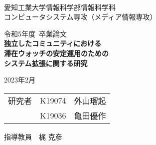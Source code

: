 \begin{titlepage}

  \ \\
  \begin{center}

    {\LARGE 愛知工業大学情報科学部情報科学科\\
      コンピュータシステム専攻（メディア情報専攻）

      \vspace{1.0cm}

      令和5年度~卒業論文\\

      \vspace{2.0cm}
      {\Huge
        \baselineskip=15mm
        \textbf{独立したコミュニティにおける\\滞在ウォッチの安定運用のための\\システム拡張に関する研究\\}}

      \vspace{7.0cm}

      2023年2月\\

      \vspace{1.0cm}

      \begin{tabular}[h]{lll}
        研究者 & K19074 & 外山瑠起 \\
            & K19036 & 亀田優作 \\
      \end{tabular}

      \vspace{1.0cm}

      指導教員\ \
      梶 克彦}

  \end{center}

\end{titlepage}
